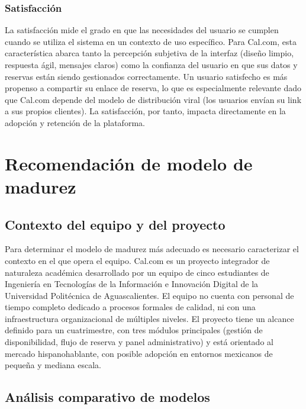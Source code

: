 \documentclass{article}
\begin{document}
\subsubsection{Satisfacción}

La satisfacción mide el grado en que las necesidades del usuario se cumplen cuando se utiliza el sistema en un contexto de uso específico. Para Cal.com, esta característica abarca tanto la percepción subjetiva de la interfaz (diseño limpio, respuesta ágil, mensajes claros) como la confianza del usuario en que sus datos y reservas están siendo gestionados correctamente. Un usuario satisfecho es más propenso a compartir su enlace de reserva, lo que es especialmente relevante dado que Cal.com depende del modelo de distribución viral (los usuarios envían su link a sus propios clientes). La satisfacción, por tanto, impacta directamente en la adopción y retención de la plataforma.

\newpage
\section{Recomendación de modelo de madurez}

\subsection{Contexto del equipo y del proyecto}

Para determinar el modelo de madurez más adecuado es necesario caracterizar el contexto en el que opera el equipo. Cal.com es un proyecto integrador de naturaleza académica desarrollado por un equipo de cinco estudiantes de Ingeniería en Tecnologías de la Información e Innovación Digital de la Universidad Politécnica de Aguascalientes. El equipo no cuenta con personal de tiempo completo dedicado a procesos formales de calidad, ni con una infraestructura organizacional de múltiples niveles. El proyecto tiene un alcance definido para un cuatrimestre, con tres módulos principales (gestión de disponibilidad, flujo de reserva y panel administrativo) y está orientado al mercado hispanohablante, con posible adopción en entornos mexicanos de pequeña y mediana escala.

\subsection{Análisis comparativo de modelos}
\end{document}
